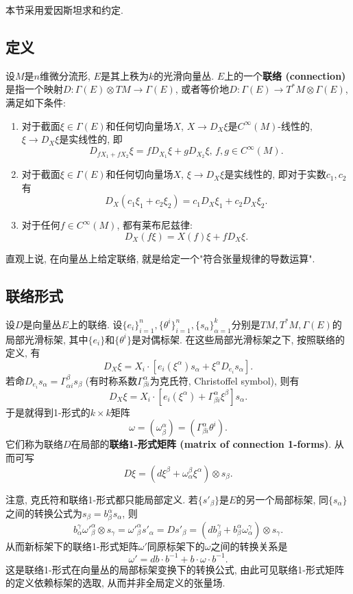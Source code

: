 
本节采用爱因斯坦求和约定.

\subsection{定义}
设$M$是$n$维微分流形, $E$是其上秩为$k$的光滑向量丛. $E$上的一个\textbf{联络 (connection) }是指一个映射$D:\Gamma(E)\otimes TM\to\Gamma(E)$, 或者等价地$D:\Gamma(E)\to T^*M\otimes\Gamma(E)$, 满足如下条件:

\begin{enumerate}
\item 对于截面$\xi\in\Gamma(E)$和任何切向量场$X$, $X\to D_X\xi$是$C^\infty(M)$-线性的, $\xi\to D_X\xi$是实线性的, 即
$$
D_{fX_1+fX_2}\xi=fD_{X_1}\xi+gD_{X_2}\xi,\,f,g\in C^\infty(M).
$$
\item 对于截面$\xi\in\Gamma(E)$和任何切向量场$X$, $\xi\to D_X\xi$是实线性的, 即对于实数$c_1,c_2$有
$$
D_X(c_1\xi_1+c_2\xi_2)=c_1D_X\xi_1+c_2D_X\xi_2.
$$
\item 对于任何$f\in C^\infty(M)$, 都有莱布尼兹律:
$$
D_X(f\xi)=X(f)\xi+fD_X\xi.
$$
\end{enumerate}

直观上说, 在向量丛上给定联络, 就是给定一个"符合张量规律的导数运算". 

\subsection{联络形式}
设$D$是向量丛$E$上的联络. 设$\{e_i\}_{i=1}^n,\{\theta^i\}_{i=1}^n,\{s_\alpha\}_{\alpha=1}^k$分别是$TM,T^*M,\Gamma(E)$的局部光滑标架, 其中$\{e_i\}$和$\{\theta^i\}$是对偶标架. 在这些局部光滑标架之下, 按照联络的定义, 有
$$
D_X\xi=X_i\cdot\left[e_i(\xi^\alpha)s_\alpha+\xi^\alpha D_{e_i}s_\alpha\right].
$$
若命$D_{e_i}s_\alpha=\Gamma_{\alpha i}^\beta s_\beta$ (有时称系数$\Gamma^\alpha_{\beta i}$为克氏符, Christoffel symbol), 则有
$$
D_X\xi=X_i\cdot\left[e_i(\xi^\alpha)+\Gamma_{\beta i}^\alpha\xi^\beta \right]s_\alpha.
$$
于是就得到1-形式的$k\times k$矩阵
$$
\omega=(\omega_\beta^\alpha)=(\Gamma_{\beta i}^\alpha\theta^i).
$$
它们称为联络$D$在局部的\textbf{联络1-形式矩阵 (matrix of connection 1-forms)}. 从而可写
$$
D\xi=(d\xi^\beta+\omega_\alpha^\beta\xi^\alpha)\otimes s_\beta.
$$

注意, 克氏符和联络1-形式都只能局部定义. 若$\{s'_\beta\}$是$E$的另一个局部标架, 同$\{s_\alpha\}$之间的转换公式为$s_\beta=b_\beta^\alpha s_\alpha$, 则
$$
b_\alpha^\gamma{\omega'}_{\beta}^{\alpha}\otimes s_\gamma={\omega'}_{\beta}^{\alpha}s'_\alpha=Ds'_\beta=(db_\beta^\gamma+b_\beta^\alpha\omega_\alpha^\gamma)\otimes s_\gamma.
$$
从而新标架下的联络1-形式矩阵$\omega'$同原标架下的$\omega$之间的转换关系是
\begin{equation}\label{VecCon_eq1}
\omega'=db\cdot b^{-1}+b\cdot\omega\cdot b^{-1}.
\end{equation}
这是联络1-形式在向量丛的局部标架变换下的转换公式, 由此可见联络1-形式矩阵的定义依赖标架的选取, 从而并非全局定义的张量场.

